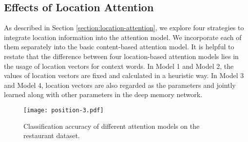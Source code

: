 \documentclass[11pt,letterpaper]{article}
\begin{document}
\subsection{Effects of Location Attention}
As described in Section \ref{section:location-attention}, we explore four strategies to integrate location information into the attention model. 
We incorporate each of them separately into the basic content-based attention model.
It is helpful to restate that the difference between four location-based attention models lies in the usage of location vectors for context words. In Model 1 and Model 2, the values of location vectors are fixed and calculated in a heuristic way. In Model 3 and Model 4,
location vectors are also regarded as the parameters and jointly learned along with other parameters in the deep memory network. 

\begin{figure}[h]
	\centering
	\texttt{[image: position-3.pdf]}
	\caption{Classification accuracy of different attention models on the restaurant dataset. }
	\label{fig:location}
\end{figure}
\end{document}
